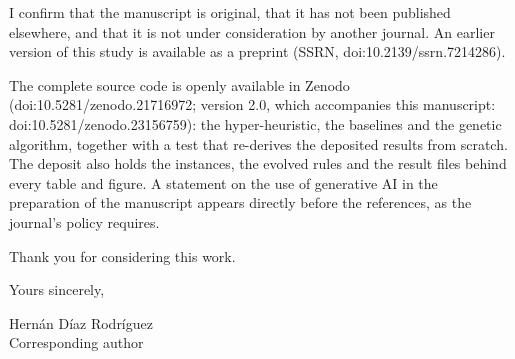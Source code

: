 \documentclass[11pt]{article}
\begin{document}
I confirm that the manuscript is original, that it has not been
published elsewhere, and that it is not under consideration by another
journal. An earlier version of this study is available as a preprint
(SSRN, doi:10.2139/ssrn.7214286).

The complete source code is openly available in Zenodo
(doi:10.5281/zenodo.21716972; version 2.0, which accompanies this
manuscript: doi:10.5281/zenodo.23156759): the hyper-heuristic, the
baselines and the genetic algorithm, together with a test that
re-derives the deposited results from scratch. The deposit also holds
the instances, the evolved rules and the result files behind every
table and figure. A statement on the use of generative AI in the
preparation of the manuscript appears directly before the references,
as the journal's policy requires.

Thank you for considering this work.

\vspace{0.7em}
\noindent Yours sincerely,

\vspace{1.2em}
\noindent Hern\'an D\'iaz Rodr\'iguez\\
Corresponding author
\end{document}
